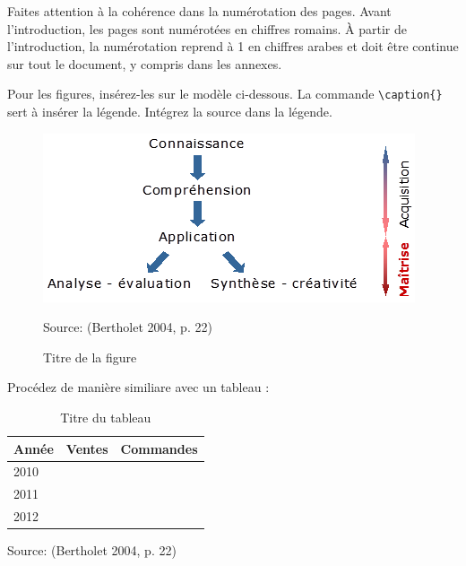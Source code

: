 Faites attention à la cohérence dans la numérotation des pages. Avant l'introduction, les pages sont numérotées en chiffres romains. À partir de l'introduction, la numérotation reprend à 1 en chiffres arabes et doit être continue sur tout le document, y compris dans les annexes.

Pour les figures, insérez-les sur le modèle ci-dessous. La commande \verb?\caption{}? sert à insérer la légende. Intégrez la source dans la légende.

\begin{figure}[H]
	\noindent \begin{centering}
		\caption{Titre de la figure}
		\bigskip{}
			\includegraphics{images/image3.png}\bigskip{}
	\par \end{centering}
	\noindent \begin{raggedleft}
		Source: (Bertholet 2004, p. 22) %
	\par \end{raggedleft}
\end{figure}

Procédez de manière similiare avec un tableau :

\begin{table}[H]
	\noindent \begin{centering}
	\caption{Titre du tableau}
	\bigskip{}
		\begin{tabular}{|m{}|m{}|m{0.4\textwidth}|}
			\hline
			\textbf{Année} & \textbf{Ventes} & \textbf{Commandes} \\
			\hline
			2010 &  &  \\
			\hline
			2011 &  &  \\
			\hline
			2012 & & \\
			\hline
		\end{tabular}
		\bigskip{}
	\par\end{centering}
	\noindent \begin{raggedleft}
		Source: (Bertholet 2004, p. 22) %
	\par\end{raggedleft}
\end{table}

